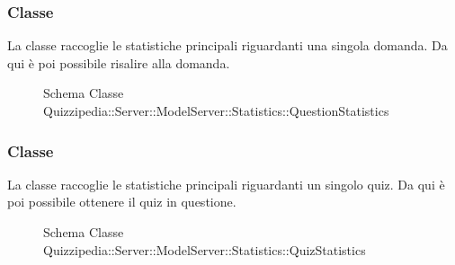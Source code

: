 \subsubsection{Classe }
La classe raccoglie le statistiche principali riguardanti una singola domanda. Da qui è poi possibile risalire alla domanda.
\begin{figure}[H]
\centering
\noindent{}
\caption[Schema Classe QuestionStatistics]{Schema Classe Quizzipedia::Server::ModelServer::Statistics::QuestionStatistics}
\end{figure}
\subsubsection{Classe }
La classe raccoglie le statistiche principali riguardanti un singolo quiz. Da qui è poi possibile ottenere il quiz in questione.
\begin{figure}[H]
\centering
\noindent{}
\caption[Schema Classe QuizStatistics]{Schema Classe Quizzipedia::Server::ModelServer::Statistics::QuizStatistics}
\end{figure}
